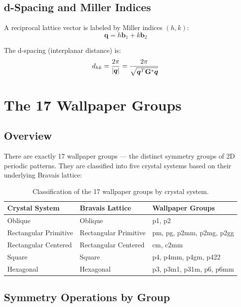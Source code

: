 \subsection{d-Spacing and Miller Indices}

A reciprocal lattice vector is labeled by Miller indices $(h, k)$:
\begin{equation}
    \boldsymbol{q} = h\boldsymbol{b}_1 + k\boldsymbol{b}_2
\end{equation}

The d-spacing (interplanar distance) is:
\begin{equation}
    d_{hk} = \frac{2\pi}{|\boldsymbol{q}|} = \frac{2\pi}{\sqrt{\boldsymbol{q}^T \mathbf{G}^* \boldsymbol{q}}}
\end{equation}

\section{The 17 Wallpaper Groups}

\subsection{Overview}

There are exactly 17 wallpaper groups — the distinct symmetry groups of 2D periodic patterns. They are classified into five crystal systems based on their underlying Bravais lattice:

\begin{table}[h]
\centering
\begin{tabular}{lll}
\hline\hline
\textbf{Crystal System} & \textbf{Bravais Lattice} & \textbf{Wallpaper Groups} \\
\hline
Oblique & Oblique & p1, p2 \\
Rectangular Primitive & Rectangular Primitive & pm, pg, p2mm, p2mg, p2gg \\
Rectangular Centered & Rectangular Centered & cm, c2mm \\
Square & Square & p4, p4mm, p4gm, p422 \\
Hexagonal & Hexagonal & p3, p3m1, p31m, p6, p6mm \\
\hline\hline
\end{tabular}
\caption{Classification of the 17 wallpaper groups by crystal system.}
\end{table}

\subsection{Symmetry Operations by Group}

